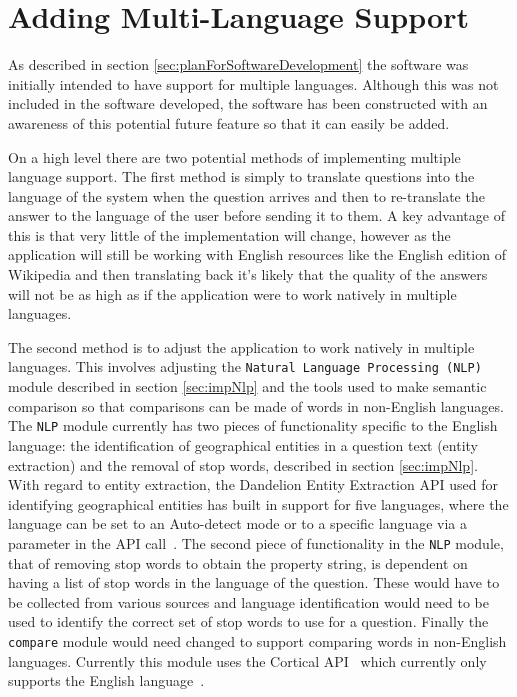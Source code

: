 \documentclass[authoryearcitations]{UoYCSproject}
\begin{document}
\section{Adding Multi-Language Support}
\label{sec:addingMultilanguageSupport}
As described in section \ref{sec:planForSoftwareDevelopment} the software was initially intended to have support for multiple languages. Although this was not included in the software developed, the software has been constructed with an awareness of this potential future feature so that it can easily be added. 

On a high level there are two potential methods of implementing multiple language support. The first method is simply to translate questions into the language of the system when the question arrives and then to re-translate the answer to the language of the user before sending it to them. A key advantage of this is that very little of the implementation will change, however as the application will still be working with English resources like the English edition of Wikipedia and then translating back it's likely that the quality of the answers will not be as high as if the application were to work natively in multiple languages.

The second method is to adjust the application to work natively in multiple languages. This involves adjusting the \texttt{Natural Language Processing (NLP)} module described in section \ref{sec:impNlp} and the tools used to make semantic comparison so that comparisons can be made of words in non-English languages. The \texttt{NLP} module currently has two pieces of functionality specific to the English language: the identification of geographical entities in a question text (entity extraction) and the removal of stop words, described in section \ref{sec:impNlp}. With regard to entity extraction, the Dandelion Entity Extraction API used for identifying geographical entities has built in support for five languages, where the language can be set to an Auto-detect mode or to a specific language via a parameter in the API call~\cite{serviceDandelionNex}. The second piece of functionality in the \texttt{NLP} module, that of removing stop words to obtain the property string, is dependent on having a list of stop words in the language of the question. These would have to be collected from various sources and language identification would need to be used to identify the correct set of stop words to use for a question. Finally the \texttt{compare} module would need changed to support comparing words in non-English languages. Currently this module uses the Cortical API~\cite{serviceCorticalSim} which currently only supports the English language~\cite{generalCorticalDoc}.
\end{document}
